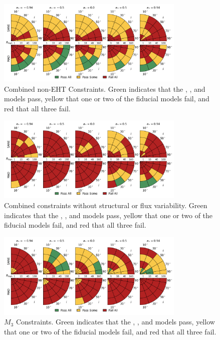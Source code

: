 \begin{figure}
  \centering
  \includegraphics[width=0.8\textwidth]{./figures/Non_Interferometric_Constraints.png}
  \caption{Combined non-EHT Constraints.  Green indicates that the \kharma, \bhac, and \hamr models pass, yellow that one or two of the fiducial models fail, and red that all three fail.}
  \label{fig:noneht_pizza}
\end{figure}


\begin{figure}
  \centering
  \includegraphics[width=0.8\textwidth]{./figures/All_Constraints.png}
  \caption{Combined constraints without structural or flux variability.  Green indicates that the \kharma, \bhac, and \hamr models pass, yellow that one or two of the fiducial models fail, and red that all three fail.}
  \label{fig:all_pizza}
\end{figure}


\begin{figure}
  \centering
  \includegraphics[width=0.8\textwidth]{./figures/230GHz_3Hr_MI_Constraints.png}
  \caption{$M_3$ Constraints.  Green indicates that the \kharma, \bhac, and \hamr models pass, yellow that one or two of the fiducial models fail, and red that all three fail.}
  \label{fig:m3_pizza}
\end{figure}

